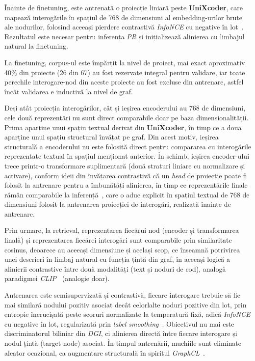 \documentclass[12pt]{article}
\numberwithin{equation}{section}
\numberwithin{figure}{section}
\numberwithin{table}{section}
\theoremstyle{definition}
\theoremstyle{plain}
\begin{document}
Înainte de finetuning, este antrenată o proiecție liniară peste \textbf{UniXcoder}, care mapează interogările în spațiul de 768 de dimensiuni al embedding-urilor brute ale nodurilor, folosind aceeași pierdere contrastivă \textit{InfoNCE} cu negative în lot~\cite{oord2018cpc,chen2020simclr}. Rezultatul este necesar pentru inferența \textit{PR} și inițializează alinierea cu limbajul natural la finetuning.

La finetuning, corpus-ul este împărțit la nivel de proiect, mai exact aproximativ 40\% din proiecte (26 din 67) au fost rezervate integral pentru validare, iar toate perechile interogare-nod din aceste proiecte au fost excluse din antrenare, astfel încât validarea e inductivă la nivel de graf.

Deși atât proiecția interogărilor, cât și ieșirea encoderului au 768 de dimensiuni, cele două reprezentări nu sunt direct comparabile doar pe baza dimensionalității. Prima aparține unui spațiu textual derivat din \textbf{UniXcoder}, în timp ce a doua aparține unui spațiu structural învățat pe graf. Din acest motiv, ieșirea structurală a encoderului nu este folosită direct pentru compararea cu interogările reprezentate textual în spațiul menționat anterior. În schimb, ieșirea encoder-ului trece printr-o transformare suplimentară (două straturi liniare cu normalizare și activare), conform ideii din învățarea contrastivă că un \textit{head} de proiecție poate fi folosit la antrenare pentru a îmbunătăți alinierea, în timp ce reprezentările finale rămân comparabile la inferență~\cite{chen2020simclr}, care o aduc explicit în spațiul textual de 768 de dimensiuni folosit la antrenarea proiecției de interogări, realizată înainte de antrenare.

Prin urmare, la retrieval, reprezentarea fiecărui nod (encoder și transformarea finală) și reprezentarea fiecărei interogări sunt comparabile prin similaritate cosinus, deoarece au aceeași dimensiune și același scop, ce înseamnă potrivirea unei descrieri în limbaj natural cu funcția țintă din graf, în aceeași logică a alinierii contrastive între două modalități (text și noduri de cod), analogă paradigmei \textit{CLIP}~\cite{radford2021clip} (analogie doar).

Antrenarea este semisupervizată și contrastivă, fiecare interogare trebuie să fie mai similară nodului pozitiv asociat decât celorlalte noduri pozitive din lot, prin entropie încrucișată peste scoruri normalizate la temperatură fixă, adică \textit{InfoNCE} cu negative în lot, regularizată prin \textit{label smoothing}~\cite{szegedy2016rethinking}. Obiectivul nu mai este discriminatorul biliniar din \textit{DGI}, ci alinierea directă între fiecare interogare și nodul țintă (target node) asociat. În timpul antrenării, muchiile sunt eliminate aleator ocazional, ca augmentare structurală în spiritul \textit{GraphCL}~\cite{you2020graphcl}.
\end{document}

